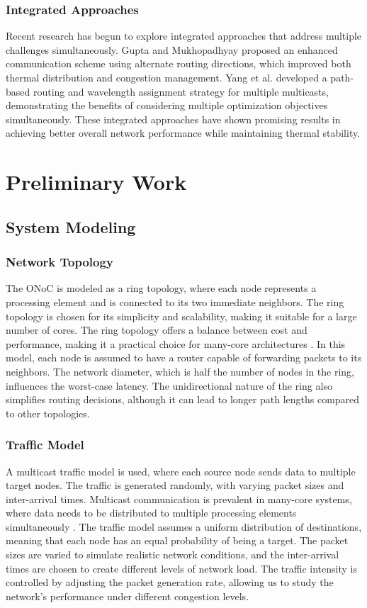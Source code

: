 \documentclass[12pt]{article}
\begin{document}
\subsection{Integrated Approaches}
Recent research has begun to explore integrated approaches that address multiple challenges simultaneously. Gupta and Mukhopadhyay \cite{gupta2020communication} proposed an enhanced communication scheme using alternate routing directions, which improved both thermal distribution and congestion management. Yang et al. \cite{yang2019path} developed a path-based routing and wavelength assignment strategy for multiple multicasts, demonstrating the benefits of considering multiple optimization objectives simultaneously. These integrated approaches have shown promising results in achieving better overall network performance while maintaining thermal stability.

\newpage

\chapter{Preliminary Work}

\section{System Modeling}
\subsection{Network Topology}
The ONoC is modeled as a ring topology, where each node represents a processing element and is connected to its two immediate neighbors. The ring topology is chosen for its simplicity and scalability, making it suitable for a large number of cores. The ring topology offers a balance between cost and performance, making it a practical choice for many-core architectures \cite{agarwal2000analysis}. In this model, each node is assumed to have a router capable of forwarding packets to its neighbors. The network diameter, which is half the number of nodes in the ring, influences the worst-case latency. The unidirectional nature of the ring also simplifies routing decisions, although it can lead to longer path lengths compared to other topologies.

\subsection{Traffic Model}
A multicast traffic model is used, where each source node sends data to multiple target nodes. The traffic is generated randomly, with varying packet sizes and inter-arrival times. Multicast communication is prevalent in many-core systems, where data needs to be distributed to multiple processing elements simultaneously \cite{dally2004interconnection}. The traffic model assumes a uniform distribution of destinations, meaning that each node has an equal probability of being a target. The packet sizes are varied to simulate realistic network conditions, and the inter-arrival times are chosen to create different levels of network load. The traffic intensity is controlled by adjusting the packet generation rate, allowing us to study the network's performance under different congestion levels.
\end{document}
